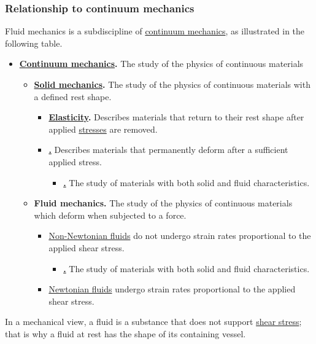 \documentclass{article}
\begin{document}
\subsubsection{Relationship to continuum mechanics}
Fluid mechanics is a subdiscipline of \href{https://en.wikipedia.org/wiki/Continuum_mechanics}{continuum mechanics}, as illustrated in the following table.
\begin{itemize}
	\item \textbf{\href{https://en.wikipedia.org/wiki/Continuum_mechanics}{Continuum mechanics}.} The study of the physics of continuous materials
	\begin{itemize}
		\item \textbf{\href{https://en.wikipedia.org/wiki/Solid_mechanics}{Solid mechanics}.} The study of the physics of continuous materials with a defined rest shape.
		\begin{itemize}
			\item \textbf{\href{https://en.wikipedia.org/wiki/Elasticity_(physics)}{Elasticity}.} Describes materials that return to their rest shape after applied \href{https://en.wikipedia.org/wiki/Stress_(physics)}{stresses} are removed.
			\item \textbf{\href{https://en.wikipedia.org/wiki/Plasticity_(physics)}.} Describes materials that permanently deform after a sufficient applied stress.
			\begin{itemize}
				\item \textbf{\href{https://en.wikipedia.org/wiki/Rheology}.} The study of materials with both solid and fluid characteristics.
			\end{itemize}
		\end{itemize}
		\item \textbf{Fluid mechanics.} The study of the physics of continuous materials which deform when subjected to a force.
		\begin{itemize}
			\item \href{https://en.wikipedia.org/wiki/Non-Newtonian_fluid}{Non-Newtonian fluids} do not undergo strain rates proportional to the applied shear stress.
			\begin{itemize}
				\item \textbf{\href{https://en.wikipedia.org/wiki/Rheology}.} The study of materials with both solid and fluid characteristics.
			\end{itemize}
			\item \href{https://en.wikipedia.org/wiki/Newtonian_fluid}{Newtonian fluids} undergo strain rates proportional to the applied shear stress.
		\end{itemize}
	\end{itemize}
\end{itemize}
In a mechanical view, a fluid is a substance that does not support \href{https://en.wikipedia.org/wiki/Shear_stress}{shear stress}; that is why a fluid at rest has the shape of its containing vessel.
\end{document}
